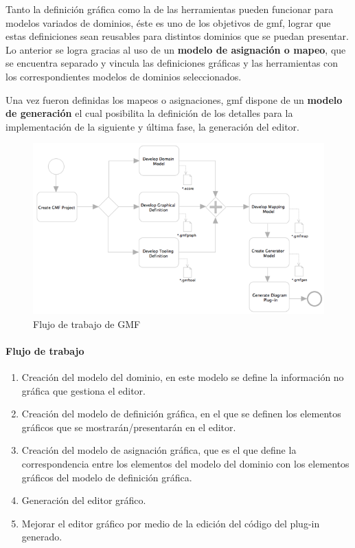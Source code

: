 \documentclass[a4paper,12pt,oneside,spanish]{book}
\begin{document}
Tanto la definición gráfica como la de las herramientas pueden funcionar para modelos variados de dominios, éste es uno de los objetivos de \gls{gmf}, lograr que estas definiciones sean reusables para distintos dominios que se puedan presentar. Lo anterior se logra gracias al uso de un \textbf{modelo de asignación o mapeo}, que se encuentra separado y vincula las definiciones gráficas y las herramientas con los correspondientes modelos de dominios seleccionados.

Una vez fueron definidas los mapeos o asignaciones, \gls{gmf} dispone de un \textbf{modelo de generación} el cual posibilita la definición de los detalles para la implementación de la siguiente y última fase, la generación del editor.


\begin{figure}[hbtp]
\centering
\includegraphics[scale=.65]{./img/GMFWorkflow}
\caption{Flujo de trabajo de GMF}
\label{fig:GMFWorkflow}
\end{figure}


\paragraph{Flujo de trabajo}

\begin{enumerate}


\item Creación del modelo del dominio, en este modelo se define la información no gráfica  que gestiona el editor.

\item Creación del modelo de definición gráfica, en el que se definen los elementos gráficos que se mostrarán/presentarán en el editor.

\item Creación del modelo de asignación gráfica, que es el que define la correspondencia entre los elementos del modelo del dominio con los elementos gráficos del modelo de definición gráfica.

\item Generación del editor gráfico.

\item Mejorar el editor gráfico por medio de la edición del código del plug-in generado.

\end{enumerate}
\end{document}
